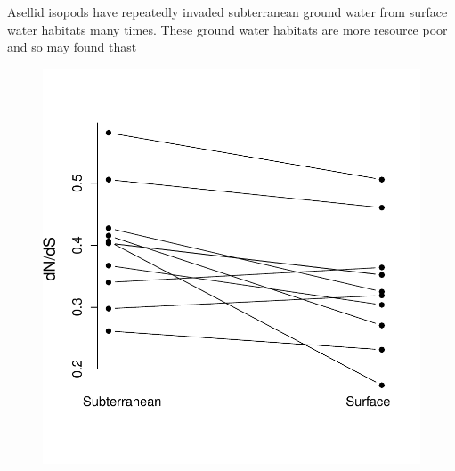 Asellid isopods have repeatedly invaded subterranean ground water from
surface water habitats many times. These ground water habitats are
more resource poor and so may
\citet{lefebure2017less} found thast

 \begin{figure}
 \begin{center}
 \includegraphics[width=\textwidth]{Journal_figs/drift_selection/asellid_isopods_Nes/asellid_isopods_Nes.pdf}
 \end{center}
 \caption{} \label{fig: asellid_isopods_Nes}
 \end{figure}



